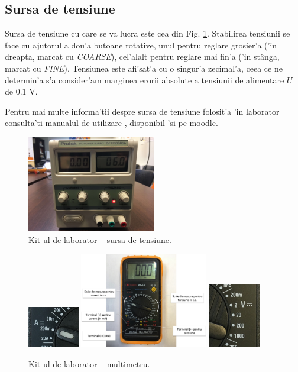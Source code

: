 \subsection{Sursa de tensiune}
\label{sectiune_sursa_tensiune}

Sursa de tensiune cu care se va lucra este cea din Fig. \ref{fig:4_sursa_tensiune}. Stabilirea tensiunii se face cu ajutorul a dou'a butoane rotative, unul pentru reglare grosier'a ('in dreapta, marcat cu \textit{COARSE}), cel'alalt pentru reglare mai fin'a ('in st\^anga, marcat cu \textit{FINE}). Tensiunea este afi'sat'a cu o singur'a zecimal'a, ceea ce ne determin'a s'a consider'am marginea erorii absolute a tensiunii de alimentare $U$ de $0.1$ V. 

Pentru mai multe informa'tii despre sursa de tensiune folosit'a 'in laborator consulta'ti manualul de utilizare \cite{PROTEK_Manuals}, disponibil 'si pe moodle.

\begin{figure}
	\centering
		\includegraphics[width=0.5\textwidth]{figuri/4_sursa_tensiune}
	\caption{Kit-ul de laborator -- sursa de tensiune.}
	\label{fig:4_sursa_tensiune}
\end{figure}
\begin{figure}
	\centering
		\includegraphics[width=0.2\textwidth]{figuri/4_multimetru_doar_curent}
		\includegraphics[width=0.5\textwidth]{figuri/4_multimetru_prel}
		\includegraphics[width=0.2\textwidth]{figuri/4_multimetru_doar_tensiune}
	\caption{Kit-ul de laborator -- multimetru.}
	\label{fig:4_multimetru}
\end{figure}

